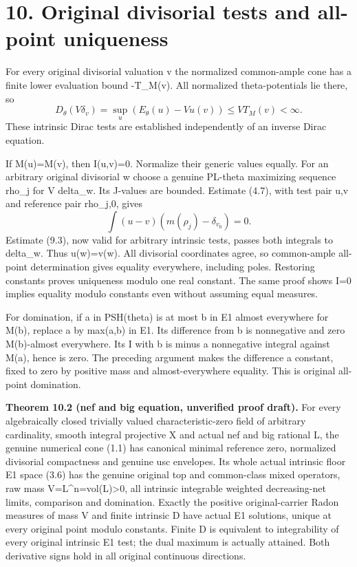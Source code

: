 \documentclass[
  10pt,
]{article}
\begin{document}
\section{10. Original divisorial tests and all-point
uniqueness}\label{original-divisorial-tests-and-all-point-uniqueness}

For every original divisorial valuation v the normalized common-ample
cone has a finite lower evaluation bound -T\_M(v). All normalized
theta-potentials lie there, so \[
 D_\theta(V\delta_v)=\sup_u(E_\theta(u)-Vu(v))\le VT_M(v)<\infty.          \tag{10.1}
\] These intrinsic Dirac tests are established independently of an
inverse Dirac equation.

If M(u)=M(v), then I(u,v)=0. Normalize their generic values equally. For
an arbitrary original divisorial w choose a genuine PL-theta maximizing
sequence rho\_j for V delta\_w. Its J-values are bounded. Estimate
(4.7), with test pair u,v and reference pair rho\_j,0, gives \[
 \int(u-v)(m(\rho_j)-\delta_{v_0})=0.
\] Estimate (9.3), now valid for arbitrary intrinsic tests, passes both
integrals to delta\_w. Thus u(w)=v(w). All divisorial coordinates agree,
so common-ample all-point determination gives equality everywhere,
including poles. Restoring constants proves uniqueness modulo one real
constant. The same proof shows I=0 implies equality modulo constants
even without assuming equal measures.

For domination, if a in PSH(theta) is at most b in E1 almost everywhere
for M(b), replace a by max(a,b) in E1. Its difference from b is
nonnegative and zero M(b)-almost everywhere. Its I with b is minus a
nonnegative integral against M(a), hence is zero. The preceding argument
makes the difference a constant, fixed to zero by positive mass and
almost-everywhere equality. This is original all-point domination.

\textbf{Theorem 10.2 (nef and big equation, unverified proof draft).}
For every algebraically closed trivially valued characteristic-zero
field of arbitrary cardinality, smooth integral projective X and actual
nef and big rational L, the genuine numerical cone (1.1) has canonical
minimal reference zero, normalized divisorial compactness and genuine
usc envelopes. Its whole actual intrinsic floor E1 space (3.6) has the
genuine original top and common-class mixed operators, raw mass
V=L\^{}n=vol(L)\textgreater0, all intrinsic integrable weighted
decreasing-net limits, comparison and domination. Exactly the positive
original-carrier Radon measures of mass V and finite intrinsic D have
actual E1 solutions, unique at every original point modulo constants.
Finite D is equivalent to integrability of every original intrinsic E1
test; the dual maximum is actually attained. Both derivative signs hold
in all original continuous directions.
\end{document}

